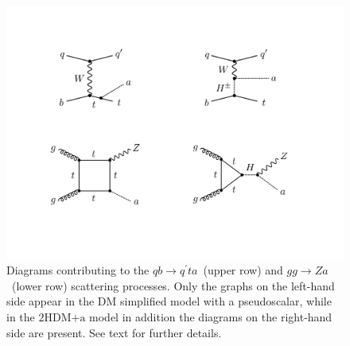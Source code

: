 \documentclass[a4paper, 11pt,notoc]{article}
\newcommand{\hdma}{\ensuremath{\textrm{2HDM+a}}\xspace}
\begin{document}
\begin{figure}[t!]
\centering
\includegraphics[width=.75\textwidth]{figure2.pdf}
\vspace{6mm}
\caption{\label{fig:diagrams}  Diagrams contributing to the $q b \to q^\prime t a$~(upper row) and $gg \to Za$~(lower row) scattering processes.  Only the graphs on the left-hand side appear in the DM simplified model with a pseudoscalar, while in the \hdma model in addition the diagrams on the right-hand side are present. See text for further details.}
\end{figure}
\end{document}
